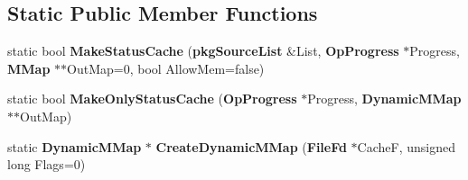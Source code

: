 \subsection*{\-Static \-Public \-Member \-Functions}
\begin{DoxyCompactItemize}
\item 
static bool {\bfseries \-Make\-Status\-Cache} ({\bf pkg\-Source\-List} \&\-List, {\bf \-Op\-Progress} $\ast$\-Progress, {\bf \-M\-Map} $\ast$$\ast$\-Out\-Map=0, bool \-Allow\-Mem=false)\label{classpkgCacheGenerator_a36e3f46eeea4e3ab29cc47df8a7858ae}

\item 
static bool {\bfseries \-Make\-Only\-Status\-Cache} ({\bf \-Op\-Progress} $\ast$\-Progress, {\bf \-Dynamic\-M\-Map} $\ast$$\ast$\-Out\-Map)\label{classpkgCacheGenerator_a717778c8384696a9bf698f9b4b17bf42}

\item 
static {\bf \-Dynamic\-M\-Map} $\ast$ {\bfseries \-Create\-Dynamic\-M\-Map} ({\bf \-File\-Fd} $\ast$\-Cache\-F, unsigned long \-Flags=0)\label{classpkgCacheGenerator_ada8dc6543bd8aafeaa3fa9056a2fcf14}

\end{DoxyCompactItemize}
